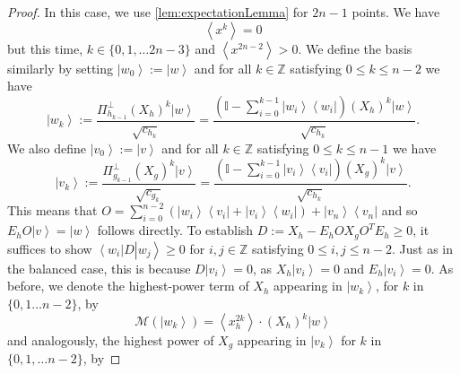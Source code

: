 \documentclass{theoretics}
\begin{document}
\begin{proof}
  In this case, we use \cref{lem:expectationLemma} for $2n-1$ points. We have
  \begin{equation}
    \left\langle x^{k}\right\rangle =0\label{eq:mochonf0unbalanced}
  \end{equation}
  but this time, $k\in\{0,1,\dots2n-3\}$ and
  $
    \left\langle x^{2n-2}\right\rangle >0.
  $
  We define the basis similarly by setting $\left|w_{0}\right\rangle :=\left|w\right\rangle $
  and for all $k\in\mathbb{Z}$ satisfying $0\le k\le n-2$ we have
  \begin{displaymath}
    \left|w_{k}\right\rangle :=\frac{\Pi_{h_{k-1}}^{\perp}(X_{h})^{k}\left|w\right\rangle }{\sqrt{c_{h_{k}}}}=\frac{\left(\mathbb{I}-\sum_{i=0}^{k-1}\left|w_{i}\right\rangle \left\langle w_{i}\right|\right)(X_{h})^{k}\left|w\right\rangle }{\sqrt{c_{h_{k}}}}.
  \end{displaymath}
  We also define $\left|v_{0}\right\rangle :=\left|v\right\rangle $ and
  for all $k\in\mathbb{Z}$ satisfying  $0\le k\le n-1$ we have
  \begin{displaymath}
    \left|v_{k}\right\rangle :=\frac{\Pi_{g_{k-1}}^{\perp}(X_{g})^{k}\left|v\right\rangle }{\sqrt{c_{g_{k}}}}=\frac{\left(\mathbb{I}-\sum_{i=0}^{k-1}\left|v_{i}\right\rangle \left\langle v_{i}\right|\right)(X_{g})^{k}\left|v\right\rangle }{\sqrt{c_{h_{k}}}}.
  \end{displaymath}
  This means that $O=\sum_{i=0}^{n-2}\left(\left|w_{i}\right\rangle \left\langle v_{i}\right|+\left|v_{i}\right\rangle \left\langle w_{i}\right|\right)+\left|v_{n}\right\rangle \left\langle v_{n}\right|$
  and so $E_{h}O\left|v\right\rangle =\left|w\right\rangle $ follows
  directly. To establish $D:=X_{h}-E_{h}OX_{g}O^{T}E_{h}\ge0$,
  it suffices to show $\left\langle w_{i}\right|D\left|w_{j}\right\rangle \ge0$ for
  $i,j\in\mathbb{Z}$ satisfying $0\le i,j\le n-2$. Just as in the balanced case, this is because $D\left|v_{i}\right\rangle =0$, as
  $X_{h}\left|v_{i}\right\rangle =0$ and $E_{h}\left|v_{i}\right\rangle =0$.
  As before, we denote the highest-power term of $X_{h}$
  appearing in $\left|w_{k}\right\rangle $, for $k$ in $\{0,1\dots n-2\}$,
  by
  \begin{displaymath}
    \mathcal{M}(\left|w_{k}\right\rangle )=\left\langle x_{h}^{2k}\right\rangle \cdot(X_{h})^{k}\left|w\right\rangle
  \end{displaymath}
  and analogously, the highest power of $X_{g}$ appearing in $\left|v_{k}\right\rangle $
  for $k$ in $\{0,1,\dots n-2\}$, by

\end{proof}
\end{document}
